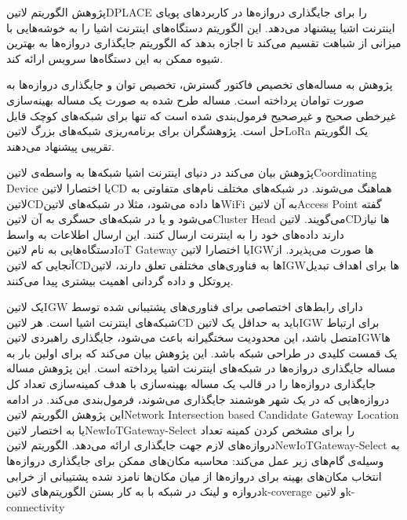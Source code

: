 پژوهش  الگوریتم ‌لاتین{DPLACE} را برای جایگذاری دروازه‌ها در کاربردهای پویای اینترنت اشیا پیشنهاد می‌دهد.
این الگوریتم دستگاه‌های اینترنت اشیا را به خوشه‌هایی با میزانی از شباهت تقسیم می‌کند تا اجازه بدهد که الگوریتم جایگذاری دروازه‌ها
به بهترین شیوه ممکن به این دستگاه‌ها سرویس ارائه کند.

پژوهش  به مساله‌های تخصیص فاکتور گسترش، تخصیص توان و جایگذاری دروازه‌ها به صورت توامان پرداخته است.
مساله طرح شده به صورت یک مساله بهینه‌سازی غیرخطی صحیح و غیرصحیح فرمول‌بندی شده است که تنها برای شبکه‌های کوچک قابل حل است.
پژوهشگران برای برنامه‌ریزی شبکه‌های بزرگ ‌لاتین{LoRa} یک الگوریتم تقریبی پیشنهاد می‌دهند.

پژوهش  بیان می‌کند در دنیای اینترنت اشیا شبکه‌ها به واسطه‌ی ‌لاتین{Coordinating Device} یا اختصارا ‌لاتین{CD} هماهنگ می‌شوند.
در شبکه‌های مختلف نام‌های متفاوتی به ‌لاتین{CD}ها داده می‌شود، مثلا در شبکه‌های ‌لاتین{WiFi} به آن ‌لاتین{Access Point} گفته می‌شود و یا در شبکه‌های حسگری
به آن ‌لاتین{Cluster Head} می‌گویند.
‌لاتین{CD}ها نیاز دارند داده‌های خود را به اینترنت ارسال کنند. این ارسال اطلاعات به واسط دستگاه‌هایی به نام ‌لاتین{IoT Gateway} یا اختصارا ‌لاتین{IGW}ها
صورت می‌پذیرد.
از آنجایی که ‌لاتین{CD}ها به فناوری‌های مختلفی تعلق دارند، ‌لاتین{IGW}ها برای اهداف تبدیل پروتکل و داده گردانی اهمیت بیشتری پیدا می‌کنند.

یک ‌لاتین{IGW} دارای رابط‌های اختصاصی برای فناوری‌های پشتیبانی شده توسط شبکه‌های اینترنت اشیا است.
هر ‌لاتین{CD} باید به حداقل یک ‌لاتین{IGW} برای ارتباط متصل باشد، این محدودیت سختگیرانه باعث می‌شود، جایگذاری راهبردی ‌لاتین{IGW}ها یک قمست کلیدی
در طراحی شبکه باشد.
این پژوهش بیان می‌کند که برای اولین بار به مساله جایگذاری دروازه‌ها در شبکه‌های اینترنت اشیا پرداخته است.
این پژوهش مساله جایگذاری دروازه‌ها را در قالب یک مساله بهینه‌سازی با هدف کمینه‌سازی تعداد کل دروازه‌هایی که در یک شهر هوشمند
جایگذاری می‌شوند، فرمول‌بندی می‌کند.
در ادامه این پژوهش الگوریتم ‌لاتین{Network Intersection based Candidate Gateway Location}
یا به اختصار ‌لاتین{NewIoTGateway-Select} را برای مشخص کردن کمینه تعداد دروازه‌های لازم جهت جایگذاری ارائه می‌دهد.
الگوریتم ‌لاتین{NewIoTGateway-Select} به وسیله‌ی گام‌های زیر عمل می‌کند:
 محاسبه مکان‌های ممکن برای جایگذاری دروازه‌ها
 انتخاب مکان‌های بهینه برای دروازه‌ها از میان مکان‌ها نامزد شده
 پشتیبانی از خرابی دروازه و لینک در شبکه با به کار بستن الگوریتم‌های ‌لاتین{k-coverage} و ‌لاتین{k-connectivity}

